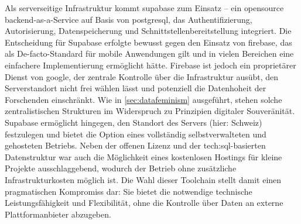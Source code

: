 Als serverseitige Infrastruktur kommt \gls{supabase} zum Einsatz -- ein \gls{opensource} \gls{backend}-as-a-Service auf Basis von \gls{postgresql}, das Authentifizierung, Autorisierung, Datenspeicherung und Schnittstellenbereitstellung integriert. Die Entscheidung für Supabase erfolgte bewusst gegen den Einsatz von \gls{firebase}, das als De-facto-Standard für mobile Anwendungen gilt und in vielen Bereichen eine einfachere Implementierung ermöglicht hätte. Firebase ist jedoch ein proprietärer Dienst von \gls{google}, der zentrale Kontrolle über die Infrastruktur ausübt, den Serverstandort nicht frei wählen lässt und potenziell die Datenhoheit der Forschenden einschränkt. Wie in \cref{sec:datafeminism} ausgeführt, stehen solche zentralistischen Strukturen im Widerspruch zu Prinzipien digitaler Souveränität. Supabase ermöglicht hingegen, den Standort des Servers (hier: Schweiz) festzulegen und bietet die Option eines vollständig selbstverwalteten und gehosteten Betriebs. Neben der offenen Lizenz und der \gls{tech:sql}-basierten Datenstruktur war auch die Möglichkeit eines kostenlosen Hostings für kleine Projekte ausschlaggebend, wodurch der Betrieb ohne zusätzliche Infrastrukturkosten möglich ist. Die Wahl dieser Toolchain stellt damit einen pragmatischen Kompromiss dar: Sie bietet die notwendige technische Leistungsfähigkeit und Flexibilität, ohne die Kontrolle über Daten an externe Plattformanbieter abzugeben.

